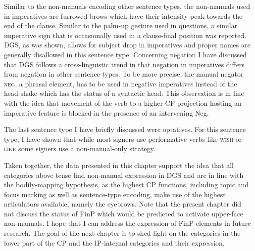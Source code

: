 Similar to the non-manuals encoding other sentence types, the non-manuals used in imperatives are furrowed brows which have their intensity peak towards the end of the clause. Similar to the palm-up gesture used in questions, a similar imperative sign that is occasionally used in a clause-final position was reported. DGS, as was shown, allows for subject drop in imperatives and proper names are generally disallowed in this sentence type. Concerning negation I have discussed that DGS follows a cross-linguistic trend in that negation in imperatives differs from negation in other sentence types. To be more precise, the manual negator \textsc{neg}, a phrasal element, has to be used in negative imperatives instead of the head-shake which has the status of a syntactic head. This observation is in line with the idea that movement of the verb to a higher CP projection hosting an imperative feature is blocked in the presence of an intervening Neg\textdegree .

The last sentence type I have briefly discussed were optatives. For this sentence type, I have shown that while most signers use performative verbs like \textsc{wish} or \textsc{like} some signers use a non-manual-only strategy.

Taken together, the data presented in this chapter support the idea that all categories above tense find non-manual expression in DGS and are in line with the bodily-mapping hypothesis, as the highest CP functions, including topic and focus marking as well as sentence-type encoding, make use of the highest articulators available, namely the eyebrows. Note that the present chapter did not discuss the status of FinP which would be predicted to activate upper-face non-manuals. I hope that I can address the expression of FinP elements in future research. The goal of the next chapter is to shed light on the categories in the lower part of the CP and the IP-internal categories and their expression.
